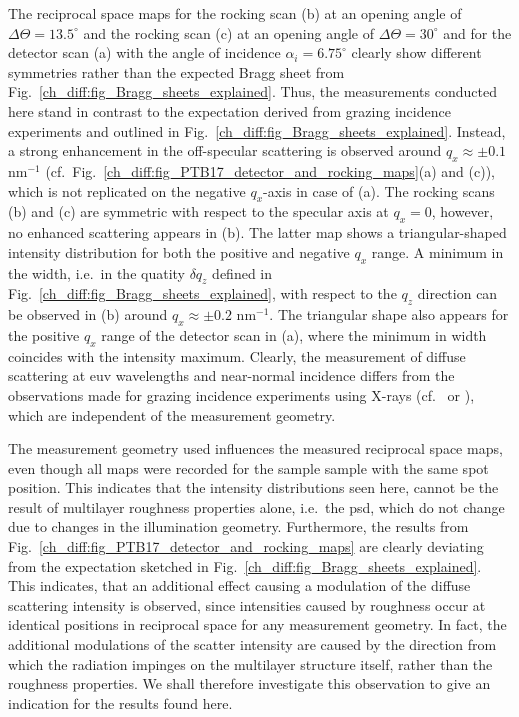 The reciprocal space maps for the rocking scan (b) at an opening angle of $\Delta \Theta = 13.5^\circ$ and the rocking scan (c) at an opening angle of $\Delta \Theta = 30^\circ$ and for the detector scan (a) with the angle of incidence $\alpha_i = 6.75^\circ$ clearly show different symmetries rather than the expected Bragg sheet from Fig.~\ref{ch_diff:fig_Bragg_sheets_explained}. Thus, the measurements conducted here stand in contrast to the expectation derived from grazing incidence experiments and outlined in Fig.~\ref{ch_diff:fig_Bragg_sheets_explained}. Instead, a strong enhancement in the off-specular scattering is observed around $q_x\approx \pm 0.1$ nm$^{-1}$ (cf.~Fig.~\ref{ch_diff:fig_PTB17_detector_and_rocking_maps}(a) and (c)), which is not replicated on the negative $q_x$-axis in case of (a). The rocking scans (b) and (c) are symmetric with respect to the specular axis at $q_x=0$, however, no enhanced scattering appears in (b). The latter map shows a triangular-shaped intensity distribution for both the positive and negative $q_x$ range. A minimum in the width, i.e.~in the quatity $\delta q_z$ defined in Fig.~\ref{ch_diff:fig_Bragg_sheets_explained}, with respect to the $q_z$ direction can be observed in (b) around $q_x \approx \pm 0.2$ nm$^{-1}$. The triangular shape also appears for the positive $q_x$ range of the detector scan in (a), where the minimum in width coincides with the intensity maximum. Clearly, the measurement of diffuse scattering at \gls{euv} wavelengths and near-normal incidence differs from the observations made for grazing incidence experiments using X-rays (cf.~\textcite{salditt_kinetic_1994} or \textcite{jiang_nonspecular_1992}), which are independent of the measurement geometry.

The measurement geometry used influences the measured reciprocal space maps, even though all maps were recorded for the sample sample with the same spot position. This indicates that the intensity distributions seen here, cannot be the result of multilayer roughness properties alone, i.e.~the \gls{psd}, which do not change due to changes in the illumination geometry. Furthermore, the results from Fig.~\ref{ch_diff:fig_PTB17_detector_and_rocking_maps} are clearly deviating from the expectation sketched in Fig.~\ref{ch_diff:fig_Bragg_sheets_explained}. This indicates, that an additional effect causing a modulation of the diffuse scattering intensity is observed, since intensities caused by roughness occur at identical positions in reciprocal space for any measurement geometry. In fact, the additional modulations of the scatter intensity are caused by the direction from which the radiation impinges on the multilayer structure itself, rather than the roughness properties. We shall therefore investigate this observation to give an indication for the results found here.


